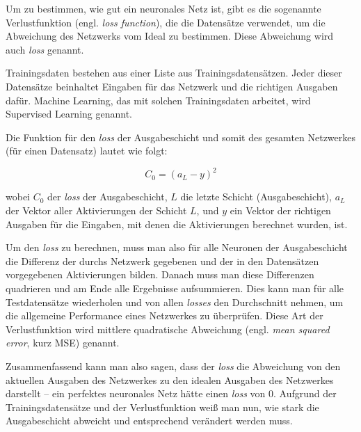 \documentclass[10pt]{article}
\newcommand{\form}[1]{#1} %
\newcommand{\eng}[1]{\textit{#1}}
\newcommand{\threesub}[1]{
        \vspace{1.5ex}
        \noindent {\textbf{#1}}
        \vspace{0.5ex}
    }
\begin{document}
\threesub{Loss} 

Um zu bestimmen, wie gut ein neuronales Netz ist, gibt es die sogenannte Verlustfunktion (engl. \eng{loss function}), die die Datensätze verwendet, um die Abweichung des Netzwerks vom Ideal zu bestimmen. Diese Abweichung wird auch \eng{loss} genannt.

Trainingsdaten bestehen aus einer Liste aus Trainingsdatensätzen. Jeder dieser Datensätze beinhaltet Eingaben für das Netzwerk und die richtigen Ausgaben dafür. Machine Learning, das mit solchen Trainingsdaten arbeitet, wird Supervised Learning genannt.

Die Funktion für den \eng{loss} der Ausgabeschicht und somit des gesamten Netzwerkes (für einen Datensatz) lautet wie folgt:

\form{ \[
	C_0 = (a_L - y)^2
\]}


\noindent wobei $C_0$ der \eng{loss} der Ausgabeschicht, $L$ die letzte Schicht (Ausgabeschicht), $a_L$ der Vektor aller Aktivierungen der Schicht $L$, und $y$ ein Vektor der richtigen Ausgaben für die Eingaben, mit denen die Aktivierungen berechnet wurden, ist. 
	
Um den \eng{loss} zu berechnen, muss man also für alle Neuronen der Ausgabeschicht die Differenz der durchs Netzwerk gegebenen und der in den Datensätzen vorgegebenen Aktivierungen bilden. Danach muss man diese Differenzen quadrieren und am Ende alle Ergebnisse aufsummieren. Dies kann man für alle Testdatensätze wiederholen und von allen \eng{losses} den Durchschnitt nehmen, um die allgemeine Performance eines Netzwerkes zu überprüfen. Diese Art der Verlustfunktion wird mittlere quadratische Abweichung (engl. \eng{mean squared error}, kurz MSE) genannt.
	
Zusammenfassend kann man also sagen, dass der \eng{loss} die Abweichung von den aktuellen Ausgaben des Netzwerkes zu den idealen Ausgaben des Netzwerkes darstellt -- ein perfektes neuronales Netz hätte einen \eng{loss} von 0. Aufgrund der Trainingsdatensätze und der Verlustfunktion weiß man nun, wie stark die Ausgabeschicht abweicht und entsprechend verändert werden muss.

\threesub{Backpropagation}


\end{document}
